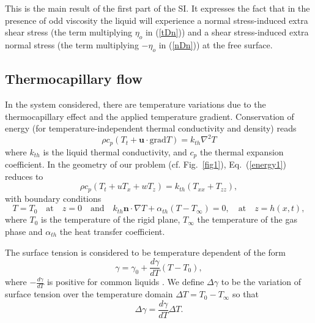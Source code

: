 \documentclass[%
 amsmath,amssymb,
 aps,
10.5pt]{revtex4-2}
\def\rr#1{(\ref{#1})}
\newcommand{\be}{\begin{equation}}
\newcommand{\ee}{\end{equation}}
\begin{document}
This is the main result of the first part of the SI. It expresses the fact that in the presence of odd viscosity 
the liquid will experience a 
normal stress-induced extra shear stress (the term multiplying $\eta_o$ in \rr{tDn})
and a shear stress-induced extra normal stress (the term multiplying $-\eta_o$ in \rr{nDn}) at the free surface. 








\subsection{Thermocapillary flow\label{sec: thermo}}
In the system considered, there are temperature variations due to 
the thermocapillary effect and the applied temperature gradient. 
Conservation of energy 
{(for temperature-independent thermal conductivity and density)} reads
\be \label{energy1}
\rho c_p (T_t + \mathbf{u}\cdot \textrm{grad} T)  =  k_{th} \nabla^2 T
\ee
where $k_{th}$ is the liquid thermal conductivity, and $c_p$ the thermal expansion coefficient. 
In the geometry of our problem (cf. Fig.~\ref{fig1}),  Eq.~\rr{energy1} reduces to 
\be\label{energy1.1}
\rho c_p (T_t + uT_x + wT_z) = k_{th}(T_{xx} + T_{zz}), 
\ee
with boundary conditions 
\be \label{bc1}
T = T_0 \quad \textrm{at} \quad z=0 \quad \textrm{and} \quad 
k_{th} \mathbf{n}\cdot \nabla T + \alpha_{th} (T - T_\infty)=0, \quad \textrm{at} \quad
z = h(x,t),
\ee
where $T_0$ is the temperature of the rigid plane, $T_\infty$ 
the temperature of the gas phase and $\alpha_{th}$ the heat transfer coefficient. 


The surface tension is considered to be temperature dependent of the form
\be 
\gamma = \gamma_0  +  \frac{d\gamma}{dT} (T - T_0),
\ee
where $-\frac{d\gamma}{dT}$ is positive for common liquids \citep{Oron1997,Davis2002}.
We define 
$\Delta \gamma$ to be 
the variation of surface tension over the temperature domain 
$\Delta T = T_0 - T_\infty$
so that
\be \label{Deltasigma}
\Delta \gamma =\frac{d\gamma}{dT} \Delta T.
\ee
\end{document}
